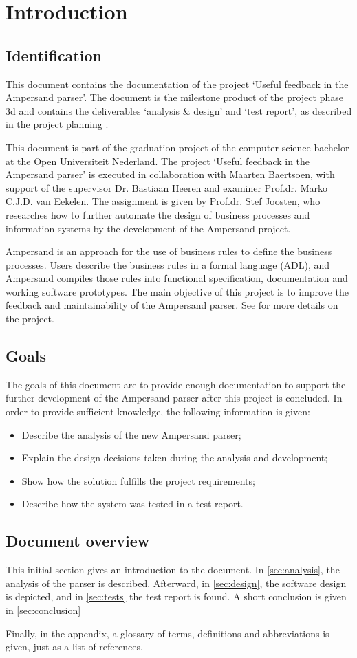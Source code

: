 \section{Introduction}
\subsection{Identification}
This document contains the documentation of the project `Useful feedback in the Ampersand parser'.
The document is the milestone product of the project phase 3d and contains the deliverables `analysis \& design' and `test report', as described in the project planning .

This document is part of the graduation project of the computer science bachelor at the Open Universiteit Nederland.
The project `Useful feedback in the Ampersand parser' is executed in collaboration with Maarten Baertsoen, with support of the supervisor Dr. Bastiaan Heeren and examiner Prof.dr. Marko C.J.D. van Eekelen.
The assignment is given by Prof.dr. Stef Joosten, who researches how to further automate the design of business processes and information systems by the development of the Ampersand project.

Ampersand is an approach for the use of business rules to define the business processes.
Users describe the business rules in a formal language (ADL), and Ampersand compiles those rules into functional specification, documentation and working software prototypes.
The main objective of this project is to improve the feedback and maintainability of the Ampersand parser.
See  for more details on the project.

\subsection{Goals}
The goals of this document are to provide enough documentation to support the further development of the Ampersand parser after this project is concluded.
In order to provide sufficient knowledge, the following information is given:
\begin{itemize}
  \item Describe the analysis of the new Ampersand parser;
  \item Explain the design decisions taken during the analysis and development;
  \item Show how the solution fulfills the project requirements;
  \item Describe how the system was tested in a test report.
\end{itemize}

\subsection{Document overview}
This initial section gives an introduction to the document.
In \autoref{sec:analysis}, the analysis of the parser is described.
Afterward, in \autoref{sec:design}, the software design is depicted, and in \autoref{sec:tests} the test report is found.
A short conclusion is given in \autoref{sec:conclusion}

Finally, in the appendix, a glossary of terms, definitions and abbreviations is given, just as a list of references.
